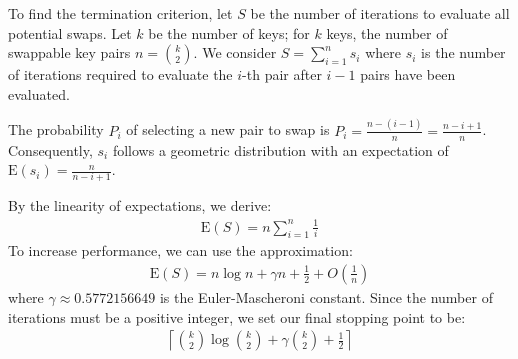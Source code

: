 To find the termination criterion, let $S$ be the number of iterations to evaluate all potential swaps. Let $k$ be the number of keys; for $k$ keys, the number of swappable key pairs $n = \binom{k}{2}$. We consider $S = \sum_{i=1}^{n} s_i$ where $s_i$ is the number of iterations required to evaluate the $i$-th pair after $i-1$ pairs have been evaluated.

The probability $P_i$ of selecting a new pair to swap is $P_i = \frac{n-(i-1)}{n} = \frac{n-i+1}{n}$. Consequently, $s_i$ follows a geometric distribution with an expectation of $\text{E}(s_i) = \frac{n}{n-i+1}$.

\noindent By the linearity of expectations, we derive:
\begin{align*}
\text{E}(S) = n \sum_{i=1}^{n} \frac{1}{i}
\end{align*}
To increase performance, we can use the approximation:
\begin{align*}
\text{E}(S) = n \log{n} + \gamma n + \frac{1}{2} +  O\left(\frac{1}{n}\right)
\end{align*}
where $\gamma \approx 0.5772156649$ is the Euler-Mascheroni constant. Since the number of iterations must be a positive integer, we set our final stopping point to be:
\begin{align*}
\left\lceil \binom{k}{2} \log{\binom{k}{2}} + \gamma \binom{k}{2} + \frac{1}{2} \right\rceil
\end{align*}



